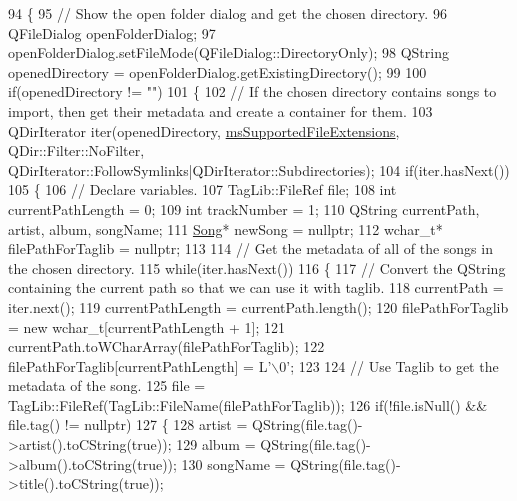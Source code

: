 \begin{DoxyCode}
94 \{
95     \textcolor{comment}{// Show the open folder dialog and get the chosen directory.}
96     QFileDialog openFolderDialog;
97     openFolderDialog.setFileMode(QFileDialog::DirectoryOnly);
98     QString openedDirectory = openFolderDialog.getExistingDirectory();
99 
100     \textcolor{keywordflow}{if}(openedDirectory != \textcolor{stringliteral}{""})
101     \{
102         \textcolor{comment}{// If the chosen directory contains songs to import, then get their metadata and create a container
       for them.}
103         QDirIterator iter(openedDirectory, \mbox{\hyperlink{class_startup_window_a7caf611224e692a7116cba45f1aa71a3}{msSupportedFileExtensions}}, 
      QDir::Filter::NoFilter, QDirIterator::FollowSymlinks|QDirIterator::Subdirectories);
104         \textcolor{keywordflow}{if}(iter.hasNext())
105         \{
106             \textcolor{comment}{// Declare variables.}
107             TagLib::FileRef file;
108             \textcolor{keywordtype}{int} currentPathLength = 0;
109             \textcolor{keywordtype}{int} trackNumber = 1;
110             QString currentPath, artist, album, songName;
111             \mbox{\hyperlink{class_song}{Song}}* newSong = \textcolor{keyword}{nullptr};
112             \textcolor{keywordtype}{wchar\_t}* filePathForTaglib = \textcolor{keyword}{nullptr};
113 
114             \textcolor{comment}{// Get the metadata of all of the songs in the chosen directory.}
115             \textcolor{keywordflow}{while}(iter.hasNext())
116             \{
117                 \textcolor{comment}{// Convert the QString containing the current path so that we can use it with taglib.}
118                 currentPath = iter.next();
119                 currentPathLength = currentPath.length();
120                 filePathForTaglib = \textcolor{keyword}{new} \textcolor{keywordtype}{wchar\_t}[currentPathLength + 1];
121                 currentPath.toWCharArray(filePathForTaglib);
122                 filePathForTaglib[currentPathLength] = L\textcolor{charliteral}{'\(\backslash\)0'};
123 
124                 \textcolor{comment}{// Use Taglib to get the metadata of the song.}
125                 file = TagLib::FileRef(TagLib::FileName(filePathForTaglib));
126                 \textcolor{keywordflow}{if}(!file.isNull() && file.tag() != \textcolor{keyword}{nullptr})
127                 \{
128                     artist = QString(file.tag()->artist().toCString(\textcolor{keyword}{true}));
129                     album = QString(file.tag()->album().toCString(\textcolor{keyword}{true}));
130                     songName = QString(file.tag()->title().toCString(\textcolor{keyword}{true}));

\end{DoxyCode}
